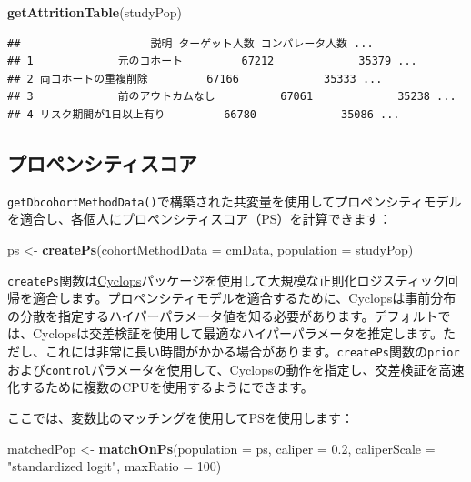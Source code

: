 \documentclass[
  11pt]{book}
\newenvironment{Shaded}{\begin{snugshade}}{\end{snugshade}}
\newcommand{\AttributeTok}[1]{\textcolor[rgb]{0.13,0.29,0.53}{#1}}
\newcommand{\DecValTok}[1]{\textcolor[rgb]{0.00,0.00,0.81}{#1}}
\newcommand{\FloatTok}[1]{\textcolor[rgb]{0.00,0.00,0.81}{#1}}
\newcommand{\FunctionTok}[1]{\textcolor[rgb]{0.13,0.29,0.53}{\textbf{#1}}}
\newcommand{\NormalTok}[1]{#1}
\newcommand{\OtherTok}[1]{\textcolor[rgb]{0.56,0.35,0.01}{#1}}
\newcommand{\StringTok}[1]{\textcolor[rgb]{0.31,0.60,0.02}{#1}}
\theoremstyle{definition}
\theoremstyle{definition}
\theoremstyle{definition}
\theoremstyle{definition}
\theoremstyle{remark}
\begin{document}
\begin{Shaded}
\begin{Highlighting}[]
\FunctionTok{getAttritionTable}\NormalTok{(studyPop)}
\end{Highlighting}
\end{Shaded}

\begin{verbatim}
##                    説明 ターゲット人数 コンパレータ人数 ...
## 1             元のコホート         67212             35379 ...
## 2 両コホートの重複削除         67166             35333 ...
## 3             前のアウトカムなし          67061             35238 ...
## 4 リスク期間が1日以上有り         66780             35086 ...
\end{verbatim}

\subsection{プロペンシティスコア}\label{ux30d7ux30edux30daux30f3ux30b7ux30c6ux30a3ux30b9ux30b3ux30a2}

\texttt{getDbcohortMethodData()}で構築された共変量を使用してプロペンシティモデルを適合し、各個人にプロペンシティスコア（PS）を計算できます：

\begin{Shaded}
\begin{Highlighting}[]
\NormalTok{ps }\OtherTok{\textless{}{-}} \FunctionTok{createPs}\NormalTok{(}\AttributeTok{cohortMethodData =}\NormalTok{ cmData, }\AttributeTok{population =}\NormalTok{ studyPop)}
\end{Highlighting}
\end{Shaded}

\texttt{createPs}関数は\href{https://ohdsi.github.io/Cyclops/}{Cyclops}パッケージを使用して大規模な正則化ロジスティック回帰を適合します。プロペンシティモデルを適合するために、Cyclopsは事前分布の分散を指定するハイパーパラメータ値を知る必要があります。デフォルトでは、Cyclopsは交差検証を使用して最適なハイパーパラメータを推定します。ただし、これには非常に長い時間がかかる場合があります。\texttt{createPs}関数の\texttt{prior}および\texttt{control}パラメータを使用して、Cyclopsの動作を指定し、交差検証を高速化するために複数のCPUを使用するようにできます。

ここでは、変数比のマッチングを使用してPSを使用します：

\begin{Shaded}
\begin{Highlighting}[]
\NormalTok{matchedPop }\OtherTok{\textless{}{-}} \FunctionTok{matchOnPs}\NormalTok{(}\AttributeTok{population =}\NormalTok{ ps, }\AttributeTok{caliper =} \FloatTok{0.2}\NormalTok{,}
                        \AttributeTok{caliperScale =} \StringTok{"standardized logit"}\NormalTok{, }\AttributeTok{maxRatio =} \DecValTok{100}\NormalTok{)}
\end{Highlighting}
\end{Shaded}
\end{document}
